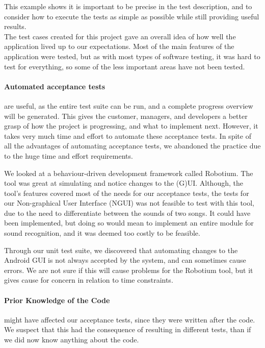 This example shows it is important to be precise in the test description, and to consider how to execute the tests as simple as possible while still providing useful results.\\

The test cases created for this project gave an overall idea of how well the application lived up to our expectations.
Most of the main features of the application were tested, but as with most types of software testing, it was hard to test for everything, so some of the less important areas have not been tested.

\paragraph{Automated acceptance tests} are useful, as the entire test suite can be run, and a complete progress overview will be generated.
This gives the customer, managers, and developers a better grasp of how the project is progressing, and what to implement next.
However, it takes very much time and effort to automate these acceptance tests.
In spite of all the advantages of automating acceptance tests, we abandoned the practice due to the huge time and effort requirements.

We looked at a behaviour-driven development framework called Robotium.
The tool was great at simulating and notice changes to the (G)UI.
Although, the tool's features covered most of the needs for our acceptance tests, the tests for our Non-graphical User Interface (NGUI) was not feasible to test with this tool, due to the need to differentiate between the sounds of two songs.
It could have been implemented, but doing so would mean to implement an entire module for sound recognition, and it was deemed too costly to be feasible. 

Through our unit test suite, we discovered that automating changes to the Android GUI is not always accepted by the system, and can sometimes cause errors.
We are not sure if this will cause problems for the Robotium tool, but it gives cause for concern in relation to time constraints.

\paragraph{Prior Knowledge of the Code} might have affected our acceptance tests, since they were written after the code. We suspect that this had the consequence of resulting in different tests, than if we did now know anything about the code. 

